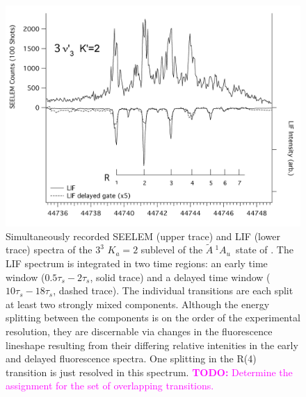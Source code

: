 \documentclass[12pt]{mitthesis}
\newcommand{\TODO} [1]{\textcolor{magenta}{\textbf{TODO:} #1}}
\newcommand{\astate}{$
  \tilde{A} \: ^1\!A_u
  $}
\newcommand{\Ka}[1]{$K_a\!\!=\!#1$}
\begin{document}

\begin{figure}
  \caption{Simultaneously recorded SEELEM (upper trace) and LIF (lower
    trace) spectra of the $3^3$ \Ka{2} sublevel of the \astate\ state
    of .  The LIF spectrum is integrated in two time regions:
    an early time window ($0.5\tau_s-2\tau_s$, solid trace) and a
    delayed time window ($10\tau_s-18\tau_s$, dashed trace).  The
    individual transitions are each split at least two strongly mixed
    components.  Although the energy splitting between the components
    is on the order of the experimental resolution, they are
    discernable via changes in the fluorescence lineshape resulting
    from their differing relative intenities in the early and delayed
    fluorescence spectra.  One splitting in the R(4) transition is
    just resolved in this spectrum.  \TODO{Determine the assignment
      for the set of overlapping transitions.}}
  \label{fig:spectrum-33k2}
  \centering
  \includegraphics[width=7in,angle=90]{acetylene-33k2-r1r7.png}
\end{figure}
\end{document}

